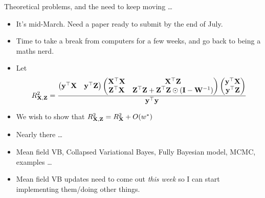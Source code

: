 \documentclass{beamer}
\begin{document}
\begin{frame}{Theoretical problems, and the need to keep moving \ldots}
\begin{itemize}
\item It's mid-March. Need a paper ready to submit by the end of July.
\item Time to take a break from computers for a few weeks, and go back to being a maths nerd.
\item Let 
\[
R^2_{{\bf X}, {\bf Z}} = \frac{
\begin{pmatrix}
{\bf y}^\top {\bf X} & {\bf y}^\top {\bf Z}
\end{pmatrix}
\begin{pmatrix}
{\bf X}^\top {\bf X} & {\bf X}^\top {\bf Z} \\
{\bf Z}^\top {\bf X} & {\bf Z}^\top {\bf Z} + {\bf Z}^\top {\bf Z} \odot ({\bf I} - {\bf W}^{-1})
\end{pmatrix}
\begin{pmatrix}
{\bf y}^\top {\bf X}\\
{\bf y}^\top {\bf Z}
\end{pmatrix}
}{{\bf y}^\top {\bf y}}
\]
\item We wish to show that $R^2_{{\bf X}, {\bf Z}} = R^2_{\bf X} + O(w^*)$
\item Nearly there \ldots
\item Mean field VB, Collapsed Variational Bayes, Fully Bayesian model, MCMC, examples \ldots
\item Mean field VB updates need to come out \emph{this week} so I can start implementing them/doing other
			things.
\end{itemize}
\end{frame}
\end{document}
